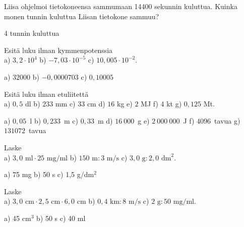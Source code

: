 \begin{tehtavasivu}
\begin{tehtava}
Liisa ohjelmoi tietokoneensa sammumaan 14400 sekunnin kuluttua.
Kuinka monen tunnin kuluttua Liisan tietokone sammuu?
\begin{vastaus}
4 tunnin kuluttua
\end{vastaus}
\end{tehtava}


\begin{tehtava}
Esitä luku ilman kymmenpotenssia \\
a) $3,2 \cdot 10^4$ \quad
b) $-7,03 \cdot 10^{-5}$ \quad
c) $10,005 \cdot 10^{-2}$. \quad
\begin{vastaus}
a) $32000$ \qquad
b) $-0,0000703$ \qquad
c) $0,10005$ \qquad
\end{vastaus}
\end{tehtava}


\begin{tehtava}
Esitä luku ilman etuliitettä \\
a) $0,5$ dl \qquad
b) $233$ mm \qquad
c) $33$ cm \qquad
d) $16$ kg \qquad
e) $2$ MJ \qquad
f) $4$ kt \qquad
g) $0,125$ Mt.
\begin{vastaus}
a) $0,05$~l \qquad
b) $0,233$~m \qquad
c) $0,33$~m \qquad
d) $16~000$~g \qquad
e) $2~000~000$~J \qquad
f) $4096$~tavua \qquad
g) $131072$~tavua
\end{vastaus}
\end{tehtava}


\begin{tehtava}
Laske \\
a) $3,0 \textrm{ ml} \cdot 25 \textrm{ mg/ml}$ \qquad
b) $150 \textrm{ m} : 3 \textrm{ m/s}$ \qquad
c) $3,0 \textrm{ g} : 2,0 \textrm{ dm}^2$.
\begin{vastaus}
a) 75 mg \qquad
b) 50 s \qquad
c) 1,5 g/dm$^2$
\end{vastaus}
\end{tehtava}

\begin{tehtava}
Laske \\
a) $3,0 \textrm{ cm} \cdot 2,5 \textrm{ cm} \cdot 6,0 \textrm{ cm}$ \qquad
b) $0,4 \textrm{ km} : 8 \textrm{ m/s}$ \qquad
c) $2 \textrm{ g} : 50 \textrm{ mg/ml}$.
\begin{vastaus}
a) 45 cm$^3$ \qquad
b) 50 s \qquad
c) 40 ml
\end{vastaus}
\end{tehtava}


\end{tehtavasivu}
